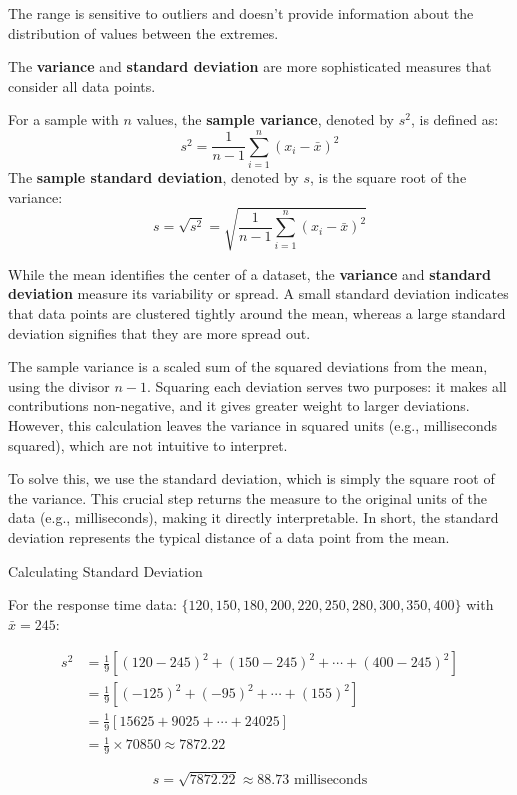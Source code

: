 \begin{remark}
The range is sensitive to outliers and doesn't provide information about the distribution of values between the extremes.
\end{remark}

The \textbf{variance} and \textbf{standard deviation} are more sophisticated measures that consider all data points.

\begin{definition}
For a sample with $n$ values, the \textbf{sample variance}, denoted by $s^2$, is defined as:
$$
s^2 = \frac{1}{n-1}\sum_{i=1}^{n}(x_i - \bar{x})^2
$$
The \textbf{sample standard deviation}, denoted by $s$, is the square root of the variance:
$$
s = \sqrt{s^2} = \sqrt{\frac{1}{n-1}\sum_{i=1}^{n}(x_i - \bar{x})^2}
$$
\end{definition}

While the mean identifies the center of a dataset, the \textbf{variance} and \textbf{standard deviation} measure its variability or spread. A small standard deviation indicates that data points are clustered tightly around the mean, whereas a large standard deviation signifies that they are more spread out.

The sample variance is a scaled sum of the squared deviations from the mean, using the divisor $n-1$. Squaring each deviation serves two purposes: it makes all contributions non-negative, and it gives greater weight to larger deviations. However, this calculation leaves the variance in squared units (e.g., milliseconds squared), which are not intuitive to interpret.

To solve this, we use the standard deviation, which is simply the square root of the variance. This crucial step returns the measure to the original units of the data (e.g., milliseconds), making it directly interpretable. In short, the standard deviation represents the typical distance of a data point from the mean.

\begin{example} Calculating Standard Deviation

    For the response time data: $\{120, 150, 180, 200, 220, 250, 280, 300, 350, 400\}$ with $\bar{x} = 245$:

\begin{align*}
s^2 &= \frac{1}{9}[(120-245)^2 + (150-245)^2 + \cdots + (400-245)^2] \\
&= \frac{1}{9}[(-125)^2 + (-95)^2 + \cdots + (155)^2] \\
&= \frac{1}{9}[15625 + 9025 + \cdots + 24025] \\
    &= \frac{1}{9} \times 70850 \approx 7872.22
\end{align*}

\[
s = \sqrt{7872.22} \approx 88.73 \text{ milliseconds}
\]
\end{example}

